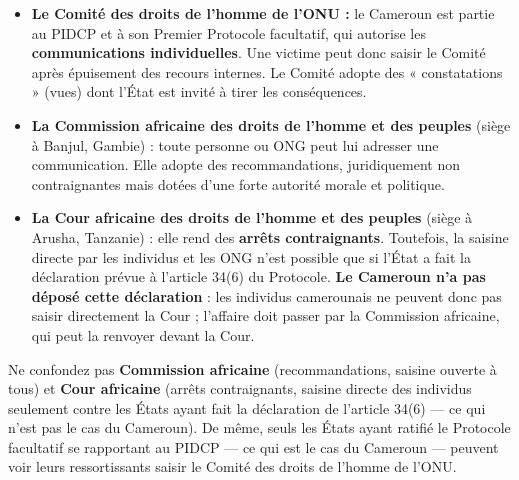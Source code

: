 \documentclass[11pt]{article}
\begin{document}
\begin{propriete}
\begin{itemize}
    \item \textbf{Le Comité des droits de l'homme de l'ONU :} le Cameroun est partie au PIDCP et à son Premier Protocole facultatif, qui autorise les \textbf{communications individuelles}. Une victime peut donc saisir le Comité après épuisement des recours internes. Le Comité adopte des « constatations » (vues) dont l'État est invité à tirer les conséquences.
    \item \textbf{La Commission africaine des droits de l'homme et des peuples} (siège à Banjul, Gambie) : toute personne ou ONG peut lui adresser une communication. Elle adopte des recommandations, juridiquement non contraignantes mais dotées d'une forte autorité morale et politique.
    \item \textbf{La Cour africaine des droits de l'homme et des peuples} (siège à Arusha, Tanzanie) : elle rend des \textbf{arrêts contraignants}. Toutefois, la saisine directe par les individus et les ONG n'est possible que si l'État a fait la déclaration prévue à l'article 34(6) du Protocole. \textbf{Le Cameroun n'a pas déposé cette déclaration} : les individus camerounais ne peuvent donc pas saisir directement la Cour ; l'affaire doit passer par la Commission africaine, qui peut la renvoyer devant la Cour.
\end{itemize}
\end{propriete}

\begin{attention}
Ne confondez pas \textbf{Commission africaine} (recommandations, saisine ouverte à tous) et \textbf{Cour africaine} (arrêts contraignants, saisine directe des individus seulement contre les États ayant fait la déclaration de l'article 34(6) — ce qui n'est pas le cas du Cameroun). De même, seuls les États ayant ratifié le Protocole facultatif se rapportant au PIDCP — ce qui est le cas du Cameroun — peuvent voir leurs ressortissants saisir le Comité des droits de l'homme de l'ONU.
\end{attention}
\end{document}
